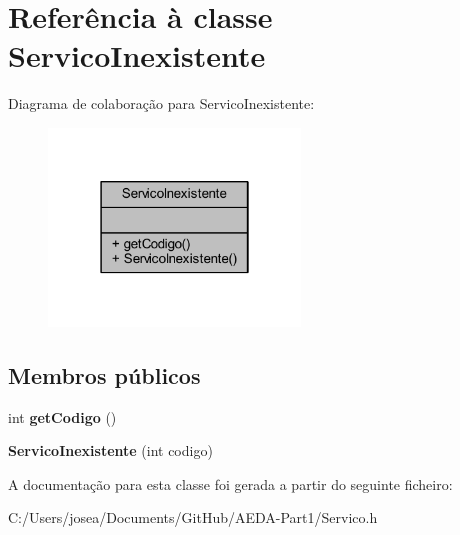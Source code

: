 \hypertarget{class_servico_inexistente}{}\section{Referência à classe Servico\+Inexistente}
\label{class_servico_inexistente}


Diagrama de colaboração para Servico\+Inexistente\+:
\nopagebreak
\begin{figure}[H]
\begin{center}
\leavevmode
\includegraphics[width=190pt]{class_servico_inexistente__coll__graph}
\end{center}
\end{figure}
\subsection*{Membros públicos}
\begin{DoxyCompactItemize}
\item 
\hypertarget{class_servico_inexistente_a12b2efab8e77afec6604eb4fef14bcf2}{}int {\bfseries get\+Codigo} ()\label{class_servico_inexistente_a12b2efab8e77afec6604eb4fef14bcf2}

\item 
\hypertarget{class_servico_inexistente_a3083bc04a8cd2cdefef0ea04b5ddcb62}{}{\bfseries Servico\+Inexistente} (int codigo)\label{class_servico_inexistente_a3083bc04a8cd2cdefef0ea04b5ddcb62}

\end{DoxyCompactItemize}


A documentação para esta classe foi gerada a partir do seguinte ficheiro\+:\begin{DoxyCompactItemize}
\item 
C\+:/\+Users/josea/\+Documents/\+Git\+Hub/\+A\+E\+D\+A-\/\+Part1/Servico.\+h\end{DoxyCompactItemize}
